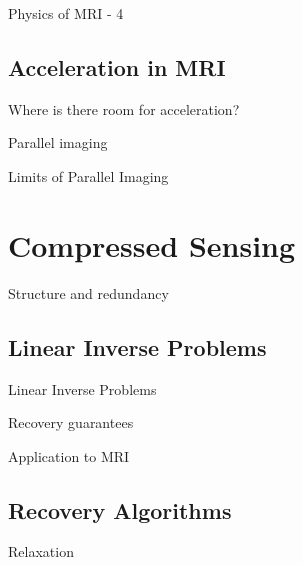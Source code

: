 \documentclass[aspectratio=169,xcolor=dvipsnames]{beamer}
\begin{document}
\begin{frame}{Physics of MRI - 4}
\end{frame}

\subsection{Acceleration in MRI}
\begin{frame}{Where is there room for acceleration?}
\end{frame}

\begin{frame}{Parallel imaging}
\end{frame}

\begin{frame}{Limits of Parallel Imaging}
\end{frame}

\section{Compressed Sensing}
\begin{frame}{Structure and redundancy}
\end{frame}

\subsection{Linear Inverse Problems}
\begin{frame}{Linear Inverse Problems}
\end{frame}

\begin{frame}{Recovery guarantees}
\end{frame}

\begin{frame}{Application to MRI}

\end{frame}

\subsection{Recovery Algorithms}
\begin{frame}{Relaxation}

\end{frame}
\end{document}
